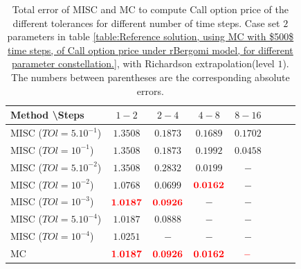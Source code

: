 \documentclass[11pt]{article}
\begin{document}
\begin{table}[h!]
	\centering
	\begin{tabular}{l*{6}{c}r}
		Method \textbackslash  Steps            & $1-2$ & $2-4$ & $4-8$ & $8-16$  \\
		\hline
		MISC ($TOl=5.10^{-1}$)  & $\mathbf{1.3508}$ & $\mathbf{  0.1873}$ & $\mathbf{
				0.1689}$ & $\mathbf{ 0.1702}$ \\
		MISC ($TOl=10^{-1}$)  & $\mathbf{1.3508}$ & $\mathbf{0.1873}$ & $\mathbf{0.1992}$ & $\mathbf{0.0458}$  \\
		MISC ($TOl=5.10^{-2}$)  & $\mathbf{1.3508}$ & $\mathbf{0.2832}$ & $\mathbf{0.0199}$ & $\mathbf{-}$  \\
		MISC ($TOl=10^{-2}$)  & $\mathbf{ 1.0768
		}$ & $\mathbf{0.0699}$ & $\mathbf{{\color{red}0.0162}}$ & $\mathbf{-}$  \\
	MISC ($TOl=10^{-3}$)  & $\mathbf{ {\color{red}1.0187}}$ & $\mathbf{{\color{red}0.0926}}$ & $\mathbf{-}$ & $\mathbf{-}$  \\
			MISC ($TOl=5.10^{-4}$)  & $\mathbf{1.0187}$ & $\mathbf{0.0888}$ & $\mathbf{-}$ & $\mathbf{-}$  \\
		MISC ($TOl=10^{-4}$)  & $\mathbf{ 1.0251}$ & $\mathbf{-}$ & $\mathbf{-}$ & $\mathbf{-}$  \\
		\hline
		
			MC &$\mathbf{ {\color{red}1.0187}}$  & $\mathbf{{\color{red}0.0926}}$ & $\mathbf{{\color{red}0.0162}}$ & $\mathbf{{\color{red}-}}$ \\
		\hline
	\end{tabular}
	\caption{Total  error of MISC and MC to compute Call option price of the different tolerances for different number of time steps. Case set $2$ parameters in table \ref{table:Reference solution, using MC with $500$ time steps, of Call option price under rBergomi model, for different parameter constellation.}, with Richardson extrapolation(level $1$). The numbers between parentheses are the corresponding absolute errors.}
	\label{Total  error of MISC and MC to compute Call option price of the different tolerances for different number of time steps. Case set $2$ parameters, with Richardson extrapolation(level $1$). The numbers between parentheses are the corresponding absolute errors.}
\end{table}
\end{document}
